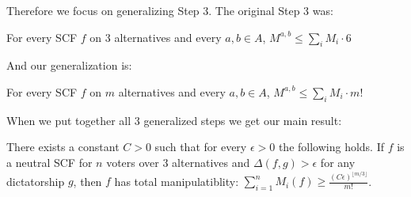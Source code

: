 	Therefore we focus on generalizing Step 3. The original Step 3 was:

	\begin{lemma}
		For every SCF $f$ on $3$ alternatives and every $a,b \in A$, $M^{a,b} \le \sum_i M_i \cdot 6$
	\end{lemma}

	And our generalization is:

	\begin{lemma}
		For every SCF $f$ on $m$ alternatives and every $a,b \in A$, $M^{a,b} \le \sum_i M_i \cdot m!$
	\end{lemma}

	When we put together all 3 generalized steps we get our main result:
	\begin{theorem}
		There exists a constant $C > 0$ such that for every $\epsilon > 0$ the following holds. If $f$ is a neutral SCF for $n$ voters over 3 alternatives and $\Delta(f, g) > \epsilon$ for any dictatorship $g$, then $f$ has total manipulatiblity: $\sum^n_{i=1} M_i(f) \ge \frac{(C\epsilon)^{\lfloor m/3 \rfloor}}{m!}$.
	\end{theorem}
